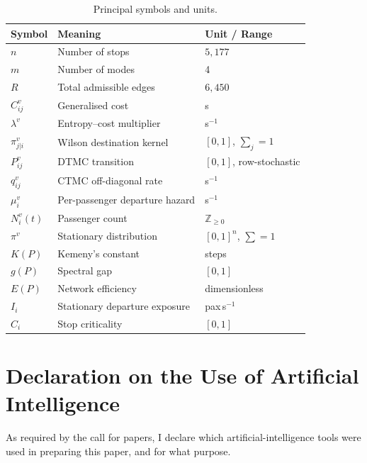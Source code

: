 \documentclass[12pt,a4paper]{article}
\theoremstyle{plain}
\theoremstyle{definition}
\theoremstyle{remark}
\begin{document}
\begin{table}[htbp]
\centering
\small
\begin{tabular}{lll}
\toprule
Symbol & Meaning & Unit / Range \\
\midrule
$n$          & Number of stops               & $5{,}177$ \\
$m$          & Number of modes               & 4 \\
$R$          & Total admissible edges        & $6{,}450$ \\
$C^v_{ij}$   & Generalised cost              & s \\
$\lambda^v$  & Entropy--cost multiplier      & s$^{-1}$ \\
$\pi^v_{j|i}$& Wilson destination kernel     & $[0,1]$, $\sum_j=1$ \\
$P^v_{ij}$   & DTMC transition               & $[0,1]$, row-stochastic \\
$q^v_{ij}$   & CTMC off-diagonal rate        & s$^{-1}$ \\
$\mu^v_i$    & Per-passenger departure hazard& s$^{-1}$ \\
$N^v_i(t)$   & Passenger count               & $\mathbb{Z}_{\ge0}$ \\
$\pi^v$      & Stationary distribution       & $[0,1]^n$, $\sum=1$ \\
$K(P)$       & Kemeny's constant             & steps \\
$g(P)$       & Spectral gap                  & $[0,1]$ \\
$E(P)$       & Network efficiency            & dimensionless \\
$I_i$        & Stationary departure exposure & pax\,s$^{-1}$ \\
$C_i$        & Stop criticality              & $[0,1]$ \\
\bottomrule
\end{tabular}
\caption{Principal symbols and units.}
\end{table}


\section{Declaration on the Use of Artificial Intelligence}
As required by the call for papers, I declare which artificial-intelligence
tools were used in preparing this paper, and for what purpose.
\end{document}
